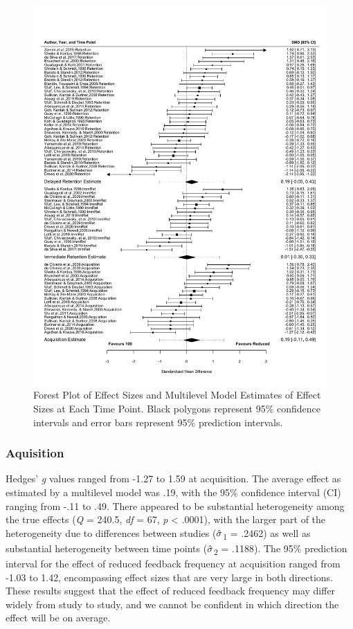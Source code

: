 \documentclass[
  english,
  man, donotrepeattitle,mask,floatsintext]{apa7}
\begin{document}
\begin{figure}

{\centering \includegraphics[height=1.8\textheight]{../../figures/fig4} 

}

\caption{Forest Plot of Effect Sizes and Multilevel Model Estimates of Effect Sizes at Each Time Point. Black polygons represent 95\% confidence intervals and error bars represent 95\% prediction intervals.}\label{fig:fig4}
\end{figure}

\hypertarget{aquisition}{%
\subsubsection{Aquisition}\label{aquisition}}

Hedges' \emph{g} values ranged from -1.27 to 1.59 at acquisition. The average effect as estimated by a multilevel model was .19, with the 95\% confidence interval (CI) ranging from -.11 to .49. There appeared to be substantial heterogeneity among the true effects (\emph{Q} = 240.5, \emph{df} = 67, \emph{p} \textless{} .0001), with the larger part of the heterogeneity due to differences between studies (\(\hat{\small\sigma}\)\textsubscript{1} = .2462) as well as substantial heterogeneity between time points (\(\hat{\small\sigma}\)\textsubscript{2} = .1188). The 95\% prediction interval for the effect of reduced feedback frequency at acquisition ranged from -1.03 to 1.42, encompassing effect sizes that are very large in both directions. These results suggest that the effect of reduced feedback frequency may differ widely from study to study, and we cannot be confident in which direction the effect will be on average.
\end{document}
